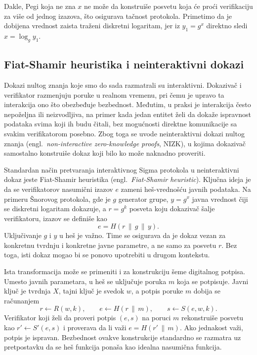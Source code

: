 Dakle, Pegi koja ne zna $x$ ne može da konstruiše posvetu koja će 
proći verifikaciju za više od jednog izazova, što osigurava tačnost 
protokola. Primetimo da je dobijena vrednost zaista traženi 
diskretni logaritam, jer iz $y_1 = g^x$ direktno sledi 
$x = \log_g y_1$.

\subsection{Fiat-Shamir heuristika i neinteraktivni dokazi}

Dokazi nultog znanja koje smo do sada razmatrali su interaktivni. 
Dokazivač i verifikator razmenjuju poruke u realnom vremenu, pri čemu 
je upravo ta interakcija ono što obezbeđuje bezbednost. Međutim, u 
praksi je interakcija često nepoželjna ili neizvodljiva, na primer 
kada jedan entitet želi da dokaže ispravnost podataka svima koji ih 
budu čitali, bez mogućnosti direktne komunikacije sa svakim 
verifikatorom posebno. Zbog toga se uvode neinteraktivni dokazi 
nultog znanja (engl.\ \textit{non-interactive zero-knowledge proofs}, 
NIZK), u kojima dokazivač samostalno konstruiše dokaz koji bilo ko 
može naknadno proveriti.

Standardan način pretvaranja interaktivnog Sigma protokola u 
neinteraktivni dokaz jeste Fiat-Shamir heuristika (engl.\ \textit{Fiat-Shamir heuristic}). 
Ključna ideja je da se verifikatorov nasumični izazov $e$ zameni heš-vrednošću javnih 
podataka. Na primeru Šnorovog protokola,
gde je $g$ generator grupe, $y=g^x$ javna vrednost čiji se diskretni
logaritam dokazuje, a $r=g^k$ posveta koju dokazivač šalje
verifikatoru, izazov se definiše kao
\[
  e = H(r \,\|\, g \,\|\, y).
\]
Uključivanje $g$ i $y$ u heš je važno. Time se osigurava da je dokaz 
vezan za konkretnu tvrdnju i konkretne javne parametre, a ne samo za 
posvetu $r$. Bez toga, isti dokaz mogao bi se ponovo upotrebiti u 
drugom kontekstu.

Ista transformacija može se primeniti i za konstrukciju šeme digitalnog 
potpisa. Umesto javnih parametara, u heš se uključuje poruka $m$ koja 
se potpisuje. Javni ključ je tvrdnja $X$, tajni ključ je svedok $w$, 
a potpis poruke $m$ dobija se računanjem
\[
  r \leftarrow R(w,k),\qquad
  e \leftarrow H(r\,\|\,m),\qquad
  s \leftarrow S(e,w,k).
\]
Verifikator koji želi da proveri potpis $(e,s)$ na poruci $m$ 
rekonstruiše posvetu kao $r' \leftarrow S'(e,s)$ i proverava da li 
važi $e = H(r'\,\|\,m)$. Ako jednakost važi, potpis je ispravan. 
Bezbednost ovakve konstrukcije standardno se razmatra uz pretpostavku 
da se heš funkcija ponaša kao idealna nasumična funkcija.


